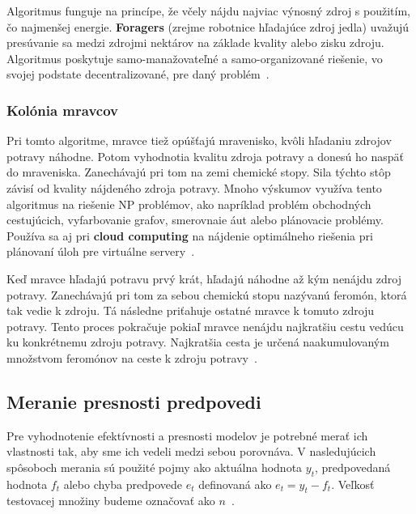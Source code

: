 \documentclass[a4paper,slovak,12pt,appendix]{article}
\begin{document}
Algoritmus funguje na princípe, že včely nájdu najviac výnosný zdroj
s použitím, čo najmenšej energie. \textbf{Foragers} (zrejme robotnice hľadajúce zdroj jedla) uvažujú
presúvanie sa medzi zdrojmi nektárov na základe kvality alebo zisku zdroju.
Algoritmus poskytuje samo-manažovateľné a samo-organizované riešenie, vo svojej
podstate decentralizované, pre daný problém~\cite{Buhussain2016}.

\subsubsection{Kolónia mravcov}
Pri tomto algoritme, mravce tiež opúšťajú mravenisko, kvôli hľadaniu zdrojov
potravy náhodne. Potom vyhodnotia kvalitu zdroja potravy a donesú ho naspäť do
mraveniska. Zanechávajú pri tom na zemi chemické stopy. Sila týchto stôp závisí
od kvality nájdeného zdroja potravy. Mnoho výskumov využíva tento algoritmus na
riešenie NP problémov, ako napríklad problém obchodných cestujúcich,
vyfarbovanie grafov, smerovnaie áut alebo plánovacie problémy. Používa sa aj pri
\textbf{cloud computing} na nájdenie optimálneho riešenia pri plánovaní úloh
pre virtuálne servery~\cite{Buhussain2016}.

Keď mravce hľadajú potravu prvý krát, hľadajú náhodne až kým nenájdu zdroj
potravy. Zanechávajú pri tom za sebou chemickú stopu nazývanú feromón, ktorá
tak vedie k zdroju. Tá následne priťahuje ostatné mravce k tomuto zdroju
potravy. Tento proces pokračuje pokiaľ mravce nenájdu najkratšiu cestu vedúcu
ku konkrétnemu zdroju potravy. Najkratšia cesta je určená naakumulovaným
množstvom feromónov na ceste k zdroju potravy~\cite{Buhussain2016}.



\subsection{Meranie presnosti predpovedi}
Pre vyhodnotenie efektívnosti a presnosti modelov je potrebné merať ich
vlastnosti tak, aby sme ich vedeli medzi sebou porovnáva. V nasledujúcich
spôsoboch merania sú použité pojmy ako aktuálna hodnota $y_t$, predpovedaná
hodnota $f_t$ alebo chyba predpovede $e_t$ definovaná ako $e_t = y_t - f_t$.
Veľkosť testovacej množiny budeme označovať ako $n$~\cite{Agrawal2013}.
\end{document}
